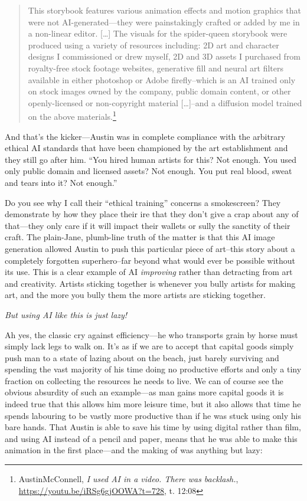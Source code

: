 \documentclass[11pt]{article}
\begin{document}
\begin{quote}
This storybook features various animation effects and motion graphics that were not AI-generated---they were painstakingly crafted or added by me in a non-linear editor. [\ldots{}] The visuals for the spider-queen storybook were produced using a variety of resources including: 2D art and character designs I commissioned or drew myself, 2D and 3D assets I purchased from royalty-free stock footage websites, generative fill and neural art filters available in either photoshop or Adobe firefly--which is an AI trained only on stock images owned by the company, public domain content, or other openly-licensed or non-copyright material [\ldots{}]--and a diffusion model trained on the above materials.\footnote{AustinMcConnell, \emph{I used AI in a video. There was backlash.}, \url{https://youtu.be/iRSg6gjOOWA?t=728}, t. 12:08}
\end{quote}

And that's the kicker---Austin was in complete compliance with the arbitrary ethical AI standards that have been championed by the art establishment and they still go after him. ``You hired human artists for this? Not enough. You used only public domain and licensed assets? Not enough. You put real blood, sweat and tears into it? Not enough.''

Do you see why I call their ``ethical training'' concerns a smokescreen? They demonstrate by how they place their ire that they don't give a crap about any of that---they only care if it will impact their wallets or sully the sanctity of their craft. The plain-Jane, plumb-line truth of the matter is that this AI image generation allowed Austin to push this particular piece of art--this story about a completely forgotten superhero--far beyond what would ever be possible without its use. This is a clear example of AI \emph{improving} rather than detracting from art and creativity. Artists sticking together is whenever you bully artists for making art, and the more you bully them the more artists are sticking together.

\emph{But using AI like this is just lazy!}

Ah yes, the classic cry against efficiency---he who transports grain by horse must simply lack legs to walk on. It's as if we are to accept that capital goods simply push man to a state of lazing about on the beach, just barely surviving and spending the vast majority of his time doing no productive efforts and only a tiny fraction on collecting the resources he needs to live. We can of course see the obvious absurdity of such an example---as man gains more capital goods it is indeed true that this allows him more leisure time, but it also allows that time he spends labouring to be vastly more productive than if he was stuck using only his bare hands. That Austin is able to save his time by using digital rather than film, and using AI instead of a pencil and paper, means that he was able to make this animation in the first place---and the making of was anything but lazy:
\end{document}
